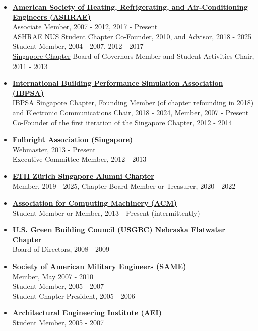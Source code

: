 \documentclass[10pt,a4paper]{article}
\begin{document}
\begin{small}
\begin{itemize}
  \item \textbf{\href{http://www.ashrae.org/}{American Society of Heating, Refrigerating, and Air-Conditioning Engineers (ASHRAE)}}\\
  Associate Member, 2007 - 2012, 2017 - Present\\ 
  ASHRAE NUS Student Chapter Co-Founder, 2010, and Advisor, 2018 - 2025\\
  Student Member, 2004 - 2007, 2012 - 2017\\
  \href{https://www.ashrae.org.sg/}{Singapore Chapter} Board of Governors Member and Student Activities Chair, 2011 - 2013
  \item \textbf{\href{http://www.ibpsa.org/}{International Building Performance Simulation Association (IBPSA)}}\\
  \href{https://ibpsasingapore.org/}{IBPSA Singapore Chapter}, Founding Member (of chapter refounding in 2018) and Electronic Communications Chair, 2018 - 2024, Member, 2007 - Present\\
  Co-Founder of the first iteration of the Singapore Chapter, 2012 - 2014
  \item \textbf{\href{https://fulbrightsg.org/}{Fulbright Association (Singapore)}}\\
  Webmaster, 2013 - Present\\
  Executive Committee Member, 2012 - 2013
  \item \textbf{\href{https://www.alumni.ethz.ch/en/mitgliederorganisationen/asien-und-australien/singapore-chapter.html}{ETH Z\"urich Singapore Alumni Chapter}}\\
  Member, 2019 - 2025, Chapter Board Member or Treasurer, 2020 - 2022
  \item \textbf{\href{https://www.acm.org/}{Association for Computing Machinery (ACM)}}\\
  Student Member or Member, 2013 - Present (intermittently)
  \item \textbf{U.S. Green Building Council (USGBC) Nebraska Flatwater Chapter}\\
  Board of Directors, 2008 - 2009
  \item \textbf{Society of American Military Engineers (SAME)}\\
  Member, May 2007 - 2010\\
  Student Member, 2005 - 2007\\
  Student Chapter President, 2005 - 2006
  \item \textbf{Architectural Engineering Institute (AEI)}\\
  Student Member, 2005 - 2007\\


\end{itemize}
\end{small}
\end{document}
